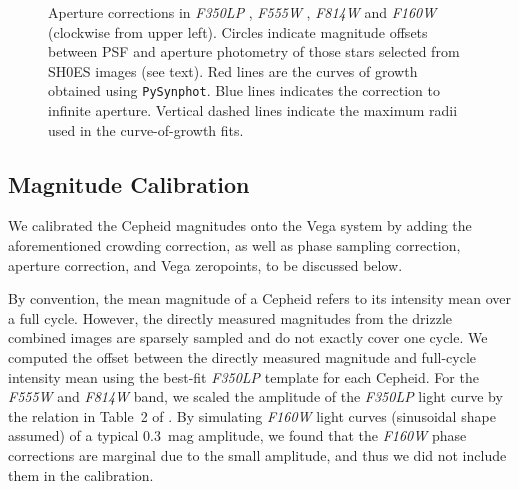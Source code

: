 \documentclass[twocolumn]{aastex63}
\newcommand{\hstw}{{\it F350LP} }
\newcommand{\hstv}{{\it F555W} }
\newcommand{\hsti}{{\it F814W} }
\newcommand{\hsth}{{\it F160W} }
\begin{document}
\begin{figure}
\caption{Aperture corrections in \hstw, \hstv, \hsti and \hsth (clockwise from upper left). Circles indicate magnitude offsets between PSF and aperture photometry of those stars selected from SH0ES images (see text). Red lines are the curves of growth obtained using {\tt PySynphot}. Blue lines indicates the correction to infinite aperture. Vertical dashed lines indicate the maximum radii used in the curve-of-growth fits.\label{fig_apc}}
\end{figure}

\subsection{Magnitude Calibration}\label{sec_cali}

We calibrated the Cepheid magnitudes onto the Vega system by adding the aforementioned crowding correction, as well as phase sampling correction, aperture correction, and Vega zeropoints, to be discussed below.

By convention, the mean magnitude of a Cepheid refers to its intensity mean over a full cycle. However, the directly measured magnitudes from the drizzle combined images are sparsely sampled and do not exactly cover one cycle. We computed the offset between the directly measured magnitude and full-cycle intensity mean using the best-fit \hstw template for each Cepheid. For the \hstv and \hsti band, we scaled the amplitude of the \hstw light curve by the relation in Table~2 of \citet{Hoffmann2016}. By simulating \hsth light curves (sinusoidal shape assumed) of a typical 0.3~mag amplitude, we found that the \hsth phase corrections are marginal due to the small amplitude, and thus we did not include them in the calibration.
\end{document}
